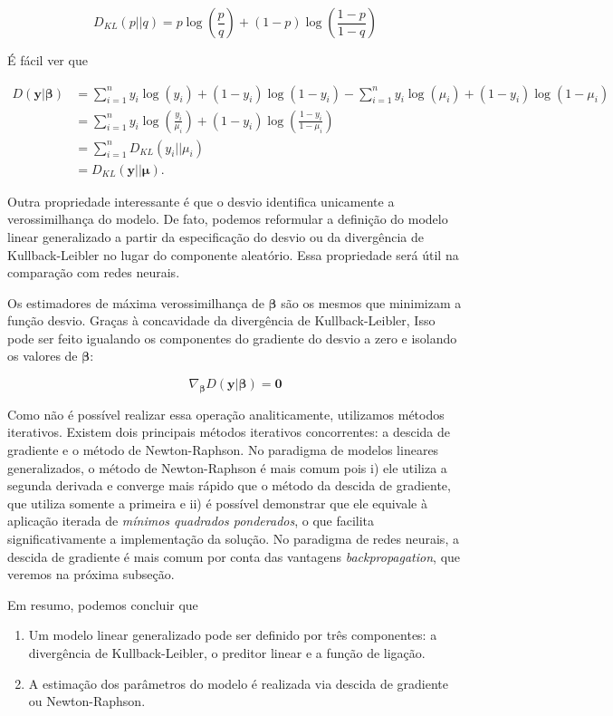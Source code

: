 \documentclass[12pt,]{report}
\providecommand{\tightlist}{%
  \setlength{\itemsep}{0pt}\setlength{\parskip}{0pt}}
\begin{document}
\[
D_{KL}(p||q) = p\log\left(\frac p q\right) + (1-p)\log\left(\frac{1-p}{1-q}\right)
\]

É fácil ver que

\[
\begin{aligned}
D(\mathbf y|{ \boldsymbol \beta}) &= \sum_{i=1}^n y_i\log(y_i) + (1-y_i)\log(1-y_i) - \sum_{i=1}^n y_i\log(\mu_i) + (1-y_i)\log(1-\mu_i) \\
&=\sum_{i=1}^ny_i\log\left(\frac{y_i}{\mu_i}\right) + (1-y_i)\log\left(\frac{1-y_i}{1-\mu_i}\right) \\
&= \sum_{i=1}^n D_{KL}(y_i||\mu_i) \\
&= D_{KL}(\mathbf y||{\boldsymbol\mu}).
\end{aligned}
\]

Outra propriedade interessante é que o desvio identifica unicamente a
verossimilhança do modelo. De fato, podemos reformular a definição do
modelo linear generalizado a partir da especificação do desvio ou da
divergência de Kullback-Leibler no lugar do componente aleatório. Essa
propriedade será útil na comparação com redes neurais.

Os estimadores de máxima verossimilhança de \(\boldsymbol \beta\) são os
mesmos que minimizam a função desvio. Graças à concavidade da
divergência de Kullback-Leibler, Isso pode ser feito igualando os
componentes do gradiente do desvio a zero e isolando os valores de
\(\boldsymbol \beta\):

\[
\nabla_{\boldsymbol \beta} D(\mathbf y|{ \boldsymbol \beta}) = \mathbf 0
\]

Como não é possível realizar essa operação analiticamente, utilizamos
métodos iterativos. Existem dois principais métodos iterativos
concorrentes: a descida de gradiente e o método de Newton-Raphson. No
paradigma de modelos lineares generalizados, o método de Newton-Raphson
é mais comum pois i) ele utiliza a segunda derivada e converge mais
rápido que o método da descida de gradiente, que utiliza somente a
primeira e ii) é possível demonstrar que ele equivale à aplicação
iterada de \emph{mínimos quadrados ponderados}, o que facilita
significativamente a implementação da solução. No paradigma de redes
neurais, a descida de gradiente é mais comum por conta das vantagens
\emph{backpropagation}, que veremos na próxima subseção.

Em resumo, podemos concluir que

\begin{enumerate}
\def\labelenumi{\arabic{enumi}.}
\tightlist
\item
  Um modelo linear generalizado pode ser definido por três componentes:
  a divergência de Kullback-Leibler, o preditor linear e a função de
  ligação.
\item
  A estimação dos parâmetros do modelo é realizada via descida de
  gradiente ou Newton-Raphson.
\end{enumerate}
\end{document}
